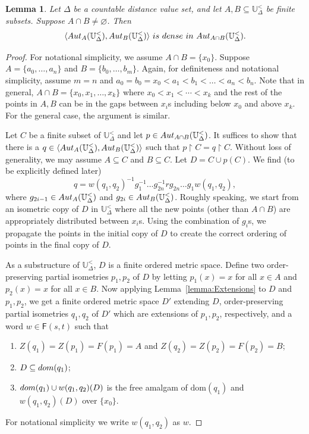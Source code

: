 \documentclass{amsart}
\newtheorem{lemma}[theorem]{Lemma}
\theoremstyle{definition}
\theoremstyle{remark}
\begin{document}
     \begin{lemma}\label{lemma:density}
        Let $\Delta$ be a countable distance value set, and let $A,B \subseteq \mathbb{U}_{\Delta}^<$ be finite subsets. Suppose $A \cap B \neq \varnothing$. Then \[\langle{\rm Aut}_A(\mathbb{U}_\Delta^<), {\rm Aut}_B(\mathbb{U}_\Delta^<) \rangle\ is \ dense \ in \ {\rm Aut}_{A\cap B}(\mathbb{U}_\Delta^<). \]
     \end{lemma}
     \begin{proof}
        For notational simplicity, we assume $A \cap B =\{x_0\}$. Suppose $A=\{a_0,\dots,a_n\}$ and $B=\{b_0,\dots,b_m\}$. Again, for definiteness and notational simplicity, assume $m=n$ and $a_0=b_0=x_0 < a_1 <b_1 <\dots<a_n <b_n$. Note that in general, $A \cap B =\{x_0,x_1,\dots, x_k\}$ where $x_0<x_1<\cdots<x_k$ and the rest of the points in $A,B$ can be in the gaps between $x_i$s including below $x_0$ and above $x_k$. For the general case, the argument is similar.

        Let $C$ be a finite subset of $\mathbb{U}_\Delta^<$ and let $p \in {\rm Aut}_{A\cap B}(\mathbb{U}_\Delta^<)$. It suffices to show that there is a $q \in \langle {\rm Aut}_A(\mathbb{U}_\Delta^<), {\rm Aut}_B(\mathbb{U}_\Delta^<) \rangle$ such that $p \upharpoonright C = q\upharpoonright C$. Without loss of generality, we may assume $A \subseteq C$ and $B \subseteq C$. Let $D = C \cup p(C)$. We find (to be explicitly defined later)
$$q=w(q_1,q_2)^{-1}g_1^{-1}\dots g_{2n}^{-1}rg_{2n}\dots g_1w(q_1,q_2), $$
where $g_{2i-1}\in {\rm Aut}_{A}(\mathbb{U}_\Delta^<)$ and $g_{2i}\in {\rm Aut}_{B}(\mathbb{U}_\Delta^<)$. Roughly speaking, we start from an isometric copy of $D$ in $\mathbb{U}_\Delta^<$ where all the new points (other than $A\cap B$) are appropriately distributed between $x_i$s. Using the combination of $g_i$s, we propagate the points in the initial copy of $D$ to create the correct ordering of points in the final copy of $D$.

As a substructure of $\mathbb{U}^<_\Delta$, $D$ is a finite ordered metric space. Define two order-preserving partial isometries $p_1,p_2$ of $D$ by letting $p_1(x)=x$ for all $x \in A$ and $p_2(x)=x$ for all $x \in B$. Now applying Lemma~\ref{lemma:Extensions} to $D$ and $p_1,p_2$, we get a finite ordered metric space $D'$ extending $D$, order-preserving partial isometries $q_1,q_2$ of $D'$ which are extensions of $p_1,p_2$, respectively, and a word $w \in \mathsf{F}(s,t)$ such that 
\begin{enumerate}
\item $Z(q_1)=Z(p_1)=F(p_1)=A$ and $Z(q_2)=Z(p_2)=F(p_2)=B$;
\item $D \subseteq {\rm dom}(q_1)$;
\item ${\rm dom}(q_1) \cup w(q_1,q_2)(D)$ is the free amalgam of $\mbox{dom}(q_1)$ and $w(q_1,q_2)(D)$ over $\{x_0\}$. 
\end{enumerate}
For notational simplicity we write $w(q_1,q_2)$ as $w$. 
      

\end{proof}
\end{document}
